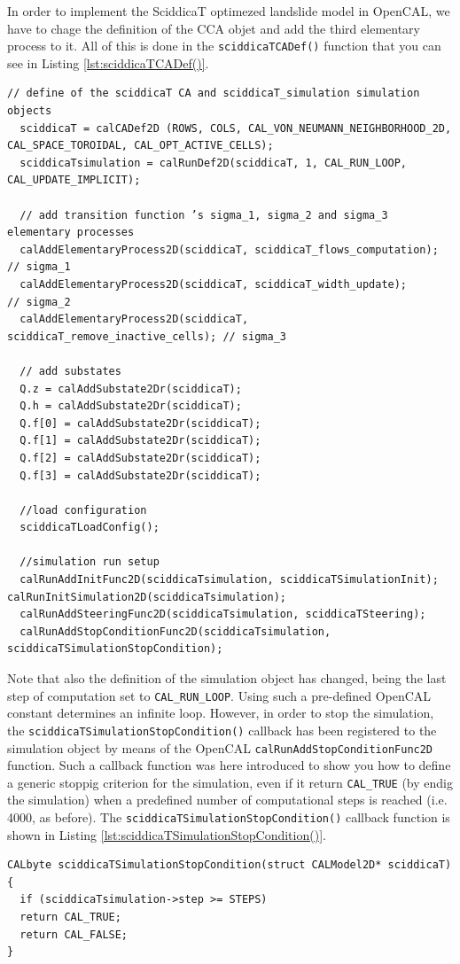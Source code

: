 In order to implement the SciddicaT optimezed landslide model in
OpenCAL, we have to chage the definition of the CCA objet and add the
third elementary process to it. All of this is done in the
\verb'sciddicaTCADef()' function that you can see in Listing
\ref{lst:sciddicaTCADef()}.

\begin{lstlisting}[float,floatplacement=H, label=lst:sciddicaTCADef(), caption=The sciddicaTCADef() definition function.]
  // define of the sciddicaT CA and sciddicaT_simulation simulation objects
  sciddicaT = calCADef2D (ROWS, COLS, CAL_VON_NEUMANN_NEIGHBORHOOD_2D, CAL_SPACE_TOROIDAL, CAL_OPT_ACTIVE_CELLS);
  sciddicaTsimulation = calRunDef2D(sciddicaT, 1, CAL_RUN_LOOP, CAL_UPDATE_IMPLICIT);

  // add transition function ’s sigma_1, sigma_2 and sigma_3 elementary processes
  calAddElementaryProcess2D(sciddicaT, sciddicaT_flows_computation);     // sigma_1
  calAddElementaryProcess2D(sciddicaT, sciddicaT_width_update);          // sigma_2
  calAddElementaryProcess2D(sciddicaT, sciddicaT_remove_inactive_cells); // sigma_3

  // add substates
  Q.z = calAddSubstate2Dr(sciddicaT);
  Q.h = calAddSubstate2Dr(sciddicaT);
  Q.f[0] = calAddSubstate2Dr(sciddicaT);
  Q.f[1] = calAddSubstate2Dr(sciddicaT);
  Q.f[2] = calAddSubstate2Dr(sciddicaT);
  Q.f[3] = calAddSubstate2Dr(sciddicaT);

  //load configuration
  sciddicaTLoadConfig();

  //simulation run setup
  calRunAddInitFunc2D(sciddicaTsimulation, sciddicaTSimulationInit); calRunInitSimulation2D(sciddicaTsimulation);
  calRunAddSteeringFunc2D(sciddicaTsimulation, sciddicaTSteering);
  calRunAddStopConditionFunc2D(sciddicaTsimulation, sciddicaTSimulationStopCondition);
\end{lstlisting}

Note that also the definition of the simulation object has changed,
being the last step of computation set to \verb'CAL_RUN_LOOP'. Using
such a pre-defined OpenCAL constant determines an infinite
loop. However, in order to stop the simulation, the
\verb'sciddicaTSimulationStopCondition()' callback has been registered
to the simulation object by means of the OpenCAL
\verb'calRunAddStopConditionFunc2D' function. Such a callback function
was here introduced to show you how to define a generic stoppig
criterion for the simulation, even if it return \verb'CAL_TRUE' (by
endig the simulation) when a predefined number of computational steps
is reached (i.e. 4000, as before). The
\verb'sciddicaTSimulationStopCondition()' callback function is shown
in Listing \ref{lst:sciddicaTSimulationStopCondition()}.

\begin{lstlisting}[float,floatplacement=H, label=lst:sciddicaTSimulationStopCondition(), caption=The sciddicaTSimulationStopCondition() callback function defining the simulation stopping criterion for the SciddicaT optimized model.]
CALbyte sciddicaTSimulationStopCondition(struct CALModel2D* sciddicaT)
{
  if (sciddicaTsimulation->step >= STEPS)
  return CAL_TRUE;
  return CAL_FALSE;
}
\end{lstlisting}
